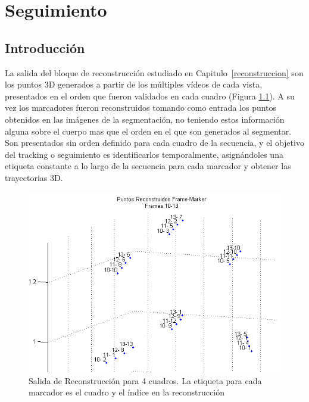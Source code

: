 \chapter{Seguimiento}
\label{seguimiento}
\section{Introducción}

La salida del bloque de reconstrucción estudiado en Capitulo~\ref{reconstruccion} son los puntos 3D generados a partir de los múltiples vídeos de cada vista, presentados en el orden que fueron validados en cada cuadro (Figura \ref{reconstr_00}). A su vez los marcadores fueron reconstruidos tomando como entrada los puntos obtenidos en las imágenes de la segmentación, no teniendo estos información alguna sobre el cuerpo mas que el orden en el que son generados al segmentar.
\\ 

Son presentados sin orden definido para cada cuadro de la secuencia, y el objetivo del tracking o seguimiento es identificarlos temporalmente, asignándoles una etiqueta constante a lo largo de la secuencia para cada marcador y obtener las trayectorias 3D.

\begin{figure}[hbt]
\begin{center}
\includegraphics[scale=0.8]{img/Tracking/00_Salida_Reconstruccion.png}
\end{center}
\caption{Salida de Reconstrucción para 4 cuadros. La etiqueta para cada marcador es el cuadro y el índice en la reconstrucción}
\label{reconstr_00}
\end{figure}

